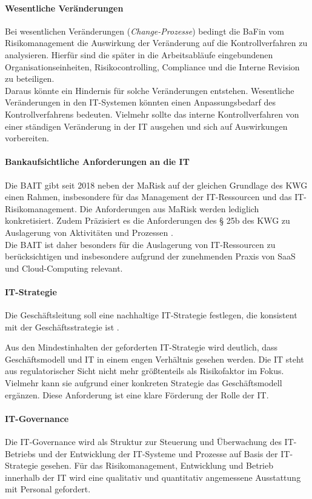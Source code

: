 \paragraph{Wesentliche Veränderungen}
Bei wesentlichen Veränderungen (\emph{Change-Prozesse}) bedingt die \ac{BaFin} \cite{MaRisk:2017} vom Risikomanagement die Auswirkung der Veränderung auf die Kontrollverfahren zu analysieren. Hierfür sind die später in die Arbeitsabläufe eingebundenen Organisationseinheiten, Risikocontrolling, Compliance und die Interne Revision zu beteiligen. 
\medskip
\\
Daraus könnte ein Hindernis für solche Veränderungen entstehen. Wesentliche Veränderungen in den IT-Systemen könnten einen Anpassungsbedarf des Kontrollverfahrens bedeuten. Vielmehr sollte das interne Kontrollverfahren von einer ständigen Veränderung in der IT ausgehen und sich auf Auswirkungen vorbereiten.

\paragraph{Bankaufsichtliche Anforderungen an die IT}
Die \ac{BAIT} gibt seit 2018 neben der \ac{MaRisk} auf der gleichen Grundlage des \ac{KWG} einen  Rahmen, insbesondere für das Management der IT-Ressourcen und das IT-Risikomanagement. Die Anforderungen aus \ac{MaRisk} werden lediglich konkretisiert. Zudem Präzisiert es die Anforderungen des § 25b des
\ac{KWG} zu Auslagerung von Aktivitäten und Prozessen \cite{BAIT:2018}.
\\
Die \ac{BAIT} ist daher besonders für die Auslagerung von IT-Ressourcen zu berücksichtigen und insbesondere aufgrund der zunehmenden Praxis von \ac{SaaS} und Cloud-Computing relevant.

\paragraph{IT-Strategie} Die Geschäftsleitung soll eine nachhaltige IT-Strategie festlegen, die konsistent mit der Geschäftsstrategie ist \cite{BAIT:2018}. 

Aus den Mindestinhalten der geforderten IT-Strategie wird deutlich, dass Geschäftsmodell und IT in einem engen Verhältnis gesehen werden. Die IT steht aus regulatorischer Sicht nicht mehr größtenteils als Risikofaktor im Fokus. Vielmehr kann sie aufgrund einer konkreten Strategie das Geschäftsmodell ergänzen. Diese Anforderung ist eine klare Förderung der Rolle der IT. 

\paragraph{IT-Governance} Die IT-Governance wird als Struktur zur Steuerung und Überwachung des IT-Betriebs und der Entwicklung der IT-Systeme und Prozesse auf Basis der IT-Strategie \cite{BAIT:2018} gesehen. Für das Risikomanagement, Entwicklung und Betrieb innerhalb der IT wird eine qualitativ und quantitativ angemessene Ausstattung mit Personal gefordert.


